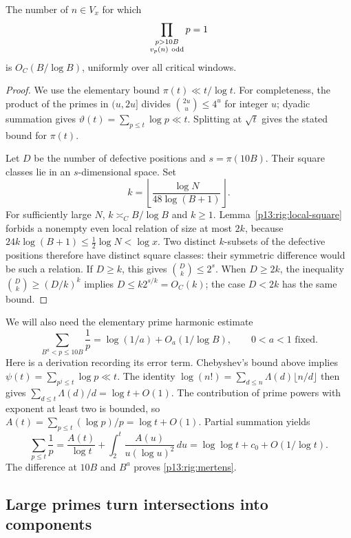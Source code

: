 \begin{lemma}
\label{p13:rig:defective}
The number of $n\in V_x$ for which
\[
             \prod_{\substack{p>10B\\v_p(n)\ {\rm odd}}}p=1
\]
is $O_C(B/\log B)$, uniformly over all critical windows.
\end{lemma}

\begin{proof}
We use the elementary bound $\pi(t)\ll t/\log t$.  For
completeness, the product of the primes in $(u,2u]$ divides
$\binom{2u}{u}\le4^u$ for integer $u$; dyadic summation gives
$\vartheta(t)=\sum_{p\le t}\log p\ll t$.  Splitting at
$\sqrt t$ gives the stated bound for $\pi(t)$.

Let $D$ be the number of defective positions and
$s=\pi(10B)$.  Their square classes lie in an $s$-dimensional
space.  Set
\[
              k=\left\lfloor
                    \frac{\log N}{48\log(B+1)}\right\rfloor.
\]
For sufficiently large $N$, $k\asymp_C B/\log B$ and $k\ge1$.
Lemma~\ref{p13:rig:local-square} forbids a nonempty even local
relation of size at most $2k$, because
$24k\log(B+1)\le\frac12\log N<\log x$.
Two distinct $k$-subsets of the defective positions therefore
have distinct square classes: their symmetric difference would
be such a relation.  If $D\ge k$, this gives
$\binom Dk\le2^s$.  When $D\ge2k$, the inequality
$\binom Dk\ge(D/k)^k$ implies $D\le k2^{s/k}=O_C(k)$;
the case $D<2k$ has the same bound.
\end{proof}

We will also need the elementary prime harmonic estimate
\begin{equation}
 \sum_{B^a<p\le10B}\frac1p
       =\log(1/a)+O_a(1/\log B),\qquad 0<a<1\text{ fixed}.
 \label{p13:rig:mertens}
\end{equation}
Here is a derivation recording its error term.  Chebyshev's bound
above implies $\psi(t)=\sum_{p^j\le t}\log p\ll t$.
The identity
$\log(n!)=\sum_{d\le n}\Lambda(d)\lfloor n/d\rfloor$
then gives $\sum_{d\le t}\Lambda(d)/d=\log t+O(1)$.
The contribution of prime powers with exponent at least two is
bounded, so $A(t)=\sum_{p\le t}(\log p)/p=\log t+O(1)$.
Partial summation yields
\[
 \sum_{p\le t}\frac1p
 =\frac{A(t)}{\log t}+\int_2^t\frac{A(u)}{u(\log u)^2}\,du
 =\log\log t+c_0+O(1/\log t).
\]
The difference at $10B$ and $B^a$ proves
\eqref{p13:rig:mertens}.

\subsection{Large primes turn intersections into components}

